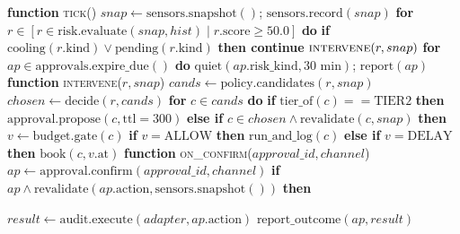 \documentclass[conference]{IEEEtran}
\begin{document}
\begin{algorithm}[!t]
\caption{1~Hz Proactive Orchestration and Per-Action Approval}
\label{alg:control}
\begin{algorithmic}[1]
\STATE \textbf{function} \textsc{tick}() 
\STATE \quad $snap \leftarrow \text{sensors.snapshot}()$; $\text{sensors.record}(snap)$
\STATE \quad \textbf{for} $r \in [r \in \text{risk.evaluate}(snap, hist) \mid r.\text{score} \ge 50.0]$ \textbf{do}
\STATE \quad \quad \textbf{if} $\text{cooling}(r.\text{kind}) \lor \text{pending}(r.\text{kind})$ \textbf{then continue}
\STATE \quad \quad $\textsc{intervene}(r, snap)$ 
\STATE \quad \textbf{for} $ap \in \text{approvals.expire\_due}()$ \textbf{do} 
\STATE \quad \quad $\text{quiet}(ap.\text{risk\_kind}, 30\text{ min})$; $\text{report}(ap)$
\STATE
\STATE \textbf{function} \textsc{intervene}($r, snap$)
\STATE \quad $cands \leftarrow \text{policy.candidates}(r, snap)$ 
\STATE \quad $chosen \leftarrow \text{decide}(r, cands)$ 
\STATE \quad \textbf{for} $c \in cands$ \textbf{do}
\STATE \quad \quad \textbf{if} $\text{tier\_of}(c) == \text{TIER2}$ \textbf{then}
\STATE \quad \quad \quad $\text{approval.propose}(c, \text{ttl}=300)$ 
\STATE \quad \quad \textbf{else if} $c \in chosen \land \text{revalidate}(c, snap)$ \textbf{then}
\STATE \quad \quad \quad $v \leftarrow \text{budget.gate}(c)$ 
\STATE \quad \quad \quad \textbf{if} $v = \text{ALLOW}$ \textbf{then} $\text{run\_and\_log}(c)$ \textbf{else if} $v = \text{DELAY}$ \textbf{then} $\text{book}(c, v.\text{at})$
\STATE
\STATE \textbf{function} \textsc{on\_confirm}($approval\_id, channel$)
\STATE \quad $ap \leftarrow \text{approval.confirm}(approval\_id, channel)$
\STATE \quad \textbf{if} $ap \land \text{revalidate}(ap.\text{action}, \text{sensors.snapshot}())$ \textbf{then}

\STATE \quad \quad $result \leftarrow \text{audit.execute}(adapter, ap.\text{action})$ 
\STATE \quad \quad $\text{report\_outcome}(ap, result)$
\end{algorithmic}
\end{algorithm}
\end{document}
